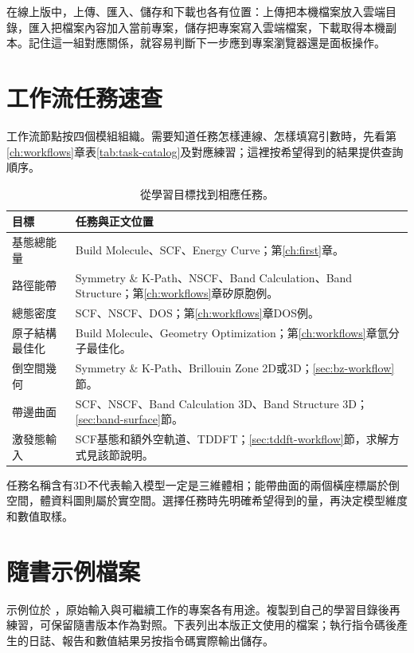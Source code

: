 在線上版中，上傳、匯入、儲存和下載也各有位置：上傳把本機檔案放入雲端目錄，匯入把檔案內容加入當前專案，儲存把專案寫入雲端檔案，下載取得本機副本。記住這一組對應關係，就容易判斷下一步應到專案瀏覽器還是面板操作。

\section{工作流任務速查}

工作流節點按四個模組組織。需要知道任務怎樣連線、怎樣填寫引數時，先看第\ref{ch:workflows}章表\ref{tab:task-catalog}及對應練習；這裡按希望得到的結果提供查詢順序。

\begin{table}[htbp]
\centering
\caption{從學習目標找到相應任務。}
\begin{tabularx}{\linewidth}{lX}
\toprule
目標 & 任務與正文位置 \\
\midrule
基態總能量 & Build Molecule、SCF、Energy Curve；第\ref{ch:first}章。 \\
路徑能帶 & Symmetry \& K-Path、NSCF、Band Calculation、Band Structure；第\ref{ch:workflows}章矽原胞例。 \\
總態密度 & SCF、NSCF、DOS；第\ref{ch:workflows}章DOS例。 \\
原子結構最佳化 & Build Molecule、Geometry Optimization；第\ref{ch:workflows}章氫分子最佳化。 \\
倒空間幾何 & Symmetry \& K-Path、Brillouin Zone 2D或3D；\ref{sec:bz-workflow}節。 \\
帶邊曲面 & SCF、NSCF、Band Calculation 3D、Band Structure 3D；\ref{sec:band-surface}節。 \\
激發態輸入 & SCF基態和額外空軌道、TDDFT；\ref{sec:tddft-workflow}節，求解方式見該節說明。 \\
\bottomrule
\end{tabularx}
\end{table}

任務名稱含有3D不代表輸入模型一定是三維體相；能帶曲面的兩個橫座標屬於倒空間，體資料圖則屬於實空間。選擇任務時先明確希望得到的量，再決定模型維度和數值取樣。


\FloatBarrier
\section{隨書示例檔案}

示例位於 ，原始輸入與可繼續工作的專案各有用途。複製到自己的學習目錄後再練習，可保留隨書版本作為對照。下表列出本版正文使用的檔案；執行指令碼後產生的日誌、報告和數值結果另按指令碼實際輸出儲存。

